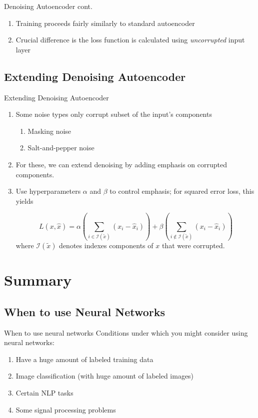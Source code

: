 \documentclass[pdf]{beamer}
\begin{document}
			\begin{frame}{Denoising Autoencoder cont.}
			\begin{enumerate}
				\item Training proceeds fairly similarly to standard autoencoder 
				\item Crucial difference is the loss function is calculated using \textit{uncorrupted} input layer 
			\end{enumerate}
			\end{frame}
			
			
	\subsection{Extending Denoising Autoencoder}
		\begin{frame} {Extending Denoising Autoencoder}
		\begin{enumerate}
			\item Some noise types only corrupt subset of the input's components 
			\begin{enumerate}[1]
				\item Masking noise
				\item Salt-and-pepper noise
			\end{enumerate}
			\item For these, we can extend denoising by adding emphasis on corrupted components.
			\item Use hyperparameters $\alpha$ and $\beta$ to control emphasis; for squared error loss, this yields
		
			$$ L(x, \hat{x}) = \alpha \left( \sum_{i \in \mathcal{I}(\tilde{x})} \left(x_i - \hat{x}_i \right) \right)   + \beta \left( \sum_{i \notin \mathcal{I}(\tilde{x})} \left(x_i - \hat{x}_i \right) \right)$$
			where $ \mathcal{I}(\tilde{x}) $ denotes indexes components of $x$ that were corrupted.
		\end{enumerate}
		\end{frame}




\section{Summary}

\subsection{When to use Neural Networks}
	\begin{frame}{When to use neural networks}
		Conditions under which you might consider using neural networks:
		\begin{enumerate}
			\item Have a huge amount of labeled training data
			\item Image classification (with huge amount of labeled images)
			\item Certain NLP tasks
			\item Some signal processing problems
		\end{enumerate}
	\end{frame}
\end{document}
